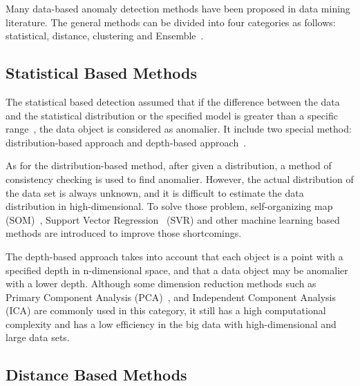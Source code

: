 Many data-based anomaly detection methods have been proposed in
data mining literature.
The general methods can be divided into four categories as follows:
statistical,
distance,
clustering and Ensemble~\cite{cook2019anomaly}.


\subsection{Statistical Based Methods}

The statistical based detection assumed that
if the difference between the data and the statistical
distribution or the specified model
is greater than a specific range~\cite{chandola2009anomaly},
the data object is considered as anomalier.
It include two special method:
distribution-based approach and
depth-based approach~\cite{wu2016survey}.

As for the distribution-based method,
after given a distribution,
a method of consistency checking is used to find anomalier.
However,
the actual distribution of the data set is always unknown,
and it is difficult to estimate the data distribution in high-dimensional.
To solve those problem,
self-organizing map (SOM)~\cite{siripanadorn2010anomaly},
Support Vector Regression~\cite{kromanis2013support} (SVR) and
other machine learning based methods are introduced to
improve those shortcomings.

The depth-based approach takes into account
that each object is a point with
a specified depth in n-dimensional space,
and that a data object may be anomalier with a lower depth.
Although some dimension reduction methods such as
Primary Component Analysis (PCA)~\cite{deng2013modified},
and Independent Component Analysis (ICA)
are commonly used in this category,
it still has a high computational complexity and
has a low efficiency in the big data with
high-dimensional and large data sets.

\subsection{Distance Based Methods}

